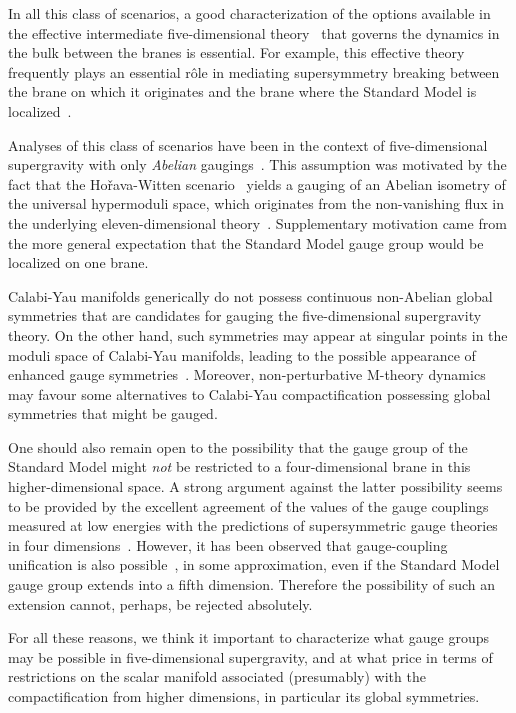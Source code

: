 \documentclass[a4paper,11pt]{article}
\begin{document}
In all this class of scenarios, a good characterization of the options
available in the effective intermediate five-dimensional
theory~\cite{CY,Gflux} that governs the dynamics in the bulk between the
branes is essential. For example, this effective theory frequently plays
an essential r\^ole in mediating supersymmetry breaking between the brane
on which it originates and the brane where the Standard Model is
localized~\cite{susyX}. 

Analyses of this class of scenarios have been in the context of
five-dimensional supergravity with only {\it Abelian} gaugings~\cite{CY}. 
This assumption was motivated by the fact that the Ho\v{r}ava-Witten
scenario~\cite{HW} yields a gauging of an Abelian isometry of the
universal hypermoduli space, which originates from the non-vanishing \coordHE{}
flux in the underlying eleven-dimensional theory~\cite{Gflux,LOSW2}. 
Supplementary motivation came from the more general expectation that the
Standard Model gauge group would be localized on one brane. 

Calabi-Yau manifolds generically do not possess continuous non-Abelian
global symmetries that are candidates for gauging the five-dimensional
supergravity theory. On the other hand, such symmetries may appear at
singular points in the moduli space of Calabi-Yau manifolds, leading to
the possible appearance of enhanced gauge symmetries~\cite{singularities}.
Moreover, non-perturbative M-theory dynamics may favour some alternatives
to Calabi-Yau compactification possessing global symmetries that might be
gauged. 

One should also remain open to the possibility that the \coordHE{} gauge group of the Standard Model might {\it not} be
restricted to a four-dimensional brane in this higher-dimensional space. A
strong argument against the latter possibility seems to be provided by the
excellent agreement of the values of the gauge couplings measured at low
energies with the predictions of supersymmetric gauge theories in four
dimensions~\cite{GR}. However, it has been observed that gauge-coupling
unification is also possible~\cite{DDG}, in some approximation, even if
the Standard Model gauge group extends into a fifth dimension. Therefore
the possibility of such an extension cannot, perhaps, be rejected
absolutely.

For all these reasons, we think it important to characterize what gauge groups may be 
possible in five-dimensional supergravity, and at what price in terms of restrictions on 
the scalar manifold associated (presumably) with the compactification from higher 
dimensions, in particular its global symmetries.
\end{document}
